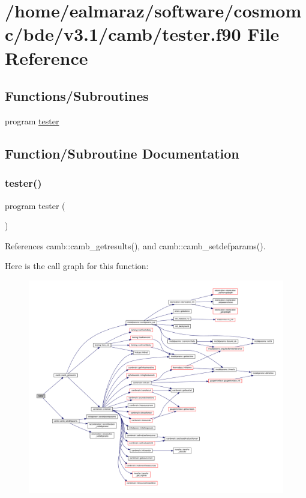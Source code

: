 \hypertarget{tester_8f90}{}\section{/home/ealmaraz/software/cosmomc/bde/v3.1/camb/tester.f90 File Reference}
\label{tester_8f90}
\subsection*{Functions/\+Subroutines}
\begin{DoxyCompactItemize}
\item 
program \mbox{\hyperlink{tester_8f90_abb1af5b22eb90cec23fca42accb63245}{tester}}
\end{DoxyCompactItemize}


\subsection{Function/\+Subroutine Documentation}
\mbox{\label{tester_8f90_abb1af5b22eb90cec23fca42accb63245}} 
\subsubsection{\texorpdfstring{tester()}{tester()}}
{\footnotesize\ttfamily program tester (\begin{DoxyParamCaption}{ }\end{DoxyParamCaption})}



References camb\+::camb\+\_\+getresults(), and camb\+::camb\+\_\+setdefparams().

Here is the call graph for this function\+:
\nopagebreak
\begin{figure}[H]
\begin{center}
\leavevmode
\includegraphics[width=350pt]{tester_8f90_abb1af5b22eb90cec23fca42accb63245_cgraph}
\end{center}
\end{figure}
